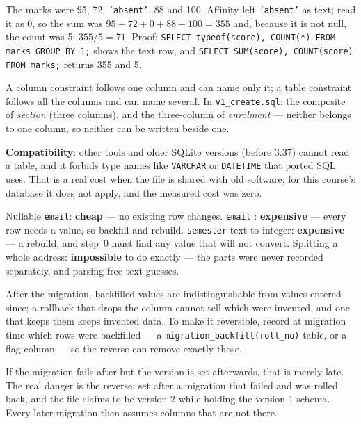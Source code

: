 \begin{ans}
  \item The marks were 95, 72, \texttt{'absent'}, 88 and 100. Affinity left
        \texttt{'absent'} as text;  read it as 0, so the sum was
        $95 + 72 + 0 + 88 + 100 = 355$ and, because it is not null, the count
        was 5: $355 / 5 = 71$. Proof: \texttt{SELECT typeof(score), COUNT(*)
        FROM marks GROUP BY 1;} shows the text row, and \texttt{SELECT
        SUM(score), COUNT(score) FROM marks;} returns 355 and 5.
  \item A column constraint follows one column and can name only it; a table
        constraint follows all the columns and can name several. In
        \texttt{v1\_create.sql}: the composite  of
        \textit{section} (three columns), and the three-column
         of \textit{enrolment} --- neither belongs to one
        column, so neither can be written beside one.
  \item \textbf{Compatibility}: other tools and older SQLite versions (before
        3.37) cannot read a  table, and it forbids type names
        like \texttt{VARCHAR} or \texttt{DATETIME} that ported SQL uses. That
        is a real cost when the file is shared with old software; for this
        course's database it does not apply, and the measured cost was zero.
\end{ans}

\begin{ans}
  \item Nullable \texttt{email}: \textbf{cheap} --- no existing row changes.
        \texttt{email} : \textbf{expensive} --- every row needs
        a value, so backfill and rebuild. \texttt{semester} text to integer:
        \textbf{expensive} --- a rebuild, and step~0 must find any value that
        will not convert. Splitting a whole address: \textbf{impossible} to do
        exactly --- the parts were never recorded separately, and parsing free
        text guesses.
  \item After the migration, backfilled values are indistinguishable from
        values entered since; a rollback that drops the column cannot tell
        which were invented, and one that keeps them keeps invented data. To
        make it reversible, record at migration time which rows were
        backfilled --- a \texttt{migration\_backfill(roll\_no)} table, or a
        flag column --- so the reverse can remove exactly those.
  \item If the migration fails after  but the version is set
        afterwards, that is merely late. The real danger is the reverse: set
        after a migration that failed and was rolled back, and the file claims
        to be version 2 while holding the version 1 schema. Every later
        migration then assumes columns that are not there.
\end{ans}

